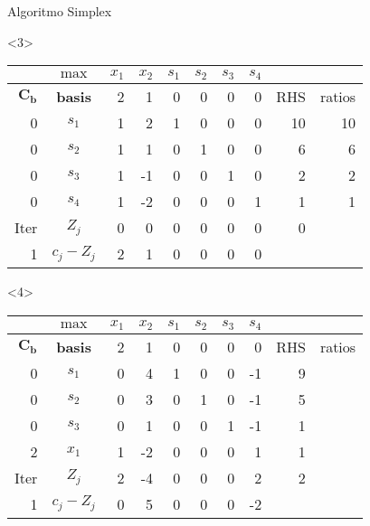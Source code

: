\begin{frameExample}{Algoritmo Simplex}{}
\begin{onlyenv}<3>  
  {\centering
      \begin{tabular}{rc|rrrrrr|rr}
  &  $\max$ & $x_1$ & $x_2$ & $s_1$ &$ s_2$ & $s_3$ & $s_4$ & & \\
  \toprule
$\mathbf{C_b}$ & \textbf{basis} & 2 & 1 & 0 & 0 & 0 & 0 & RHS & ratios \\
  \midrule
  0 & $s_1$ & 1 & 2 & 1 & 0 & 0 & 0 & 10 & 10 \\
0 & $s_2$ & 1 & 1 & 0 & 1 & 0 & 0 & 6 & 6 \\
0 & $s_3$ & 1 & -1 & 0 & 0 & 1 & 0 & 2 & 2 \\
  0 & $s_4$ & \cellcolor{yellow}1 & -2 & 0 & 0 & 0 & 1 & 1 & 1 \\
  \midrule
Iter& $Z_j$ & 0 & 0 & 0 & 0 & 0 & 0 & 0 &  \\
 1& $c_j - Z_j$ & 2 & 1 & 0 & 0 & 0 & 0 &  & 
\end{tabular}
  \par}
\end{onlyenv}

\begin{onlyenv}<4>
    {\centering
      \begin{tabular}{rc|rrrrrr|rr}
  &  $\max$ & $x_1$ & $x_2$ & $s_1$ &$ s_2$ & $s_3$ & $s_4$ & & \\
  \toprule
$\mathbf{C_b}$ & \textbf{basis} & 2 & 1 & 0 & 0 & 0 & 0 & RHS & ratios \\
  \midrule
        0 & $s_1$ & 0 & 4 & 1 & 0 & 0 & -1 & 9 &  \\
0 & $s_2$ & 0 & 3 & 0 & 1 & 0 & -1 & 5 &  \\
0 & $s_3$ & 0 & 1 & 0 & 0 & 1 & -1 & 1 &  \\
        2 & $x_1$ & \cellcolor{yellow}1 & -2 & 0 & 0 & 0 & 1 & 1 &  \\
        \midrule
Iter & $Z_j$ & 2 & -4 & 0 & 0 & 0 & 2 & 2 &  \\
1 & $c_j - Z_j$ & 0 & 5 & 0 & 0 & 0 & -2 &  & 
\end{tabular}
  \par}
\end{onlyenv}


\end{frameExample}
